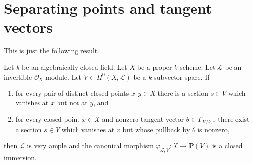 \section{Separating points and tangent vectors}
\label{section-separating-points-tangent-vectors}

\noindent
This is just the following result.

\begin{lemma}
\label{lemma-separate-points-tangent-vectors}
Let $k$ be an algebraically closed field.
Let $X$ be a proper $k$-scheme.
Let $\mathcal{L}$ be an invertible $\mathcal{O}_X$-module.
Let $V \subset H^0(X, \mathcal{L})$ be a $k$-subvector space. If
\begin{enumerate}
\item for every pair of distinct closed points $x, y \in X$
there is a section $s \in V$ which vanishes at $x$ but not at $y$, and
\item for every closed point $x \in X$ and nonzero tangent vector
$\theta \in T_{X/k, x}$ there exist a section $s \in V$
which vanishes at $x$ but whose pullback by $\theta$ is nonzero,
\end{enumerate}
then $\mathcal{L}$ is very ample and the canonical morphism
$\varphi_{\mathcal{L}, V} : X \to \mathbf{P}(V)$
is a closed immersion.
\end{lemma}

